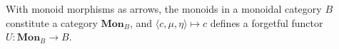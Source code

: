 With monoid morphisms as arrows, the monoids in a monoidal category $B$ constitute a category $\mathbf{Mon}_B$, and $\langle c, \mu, \eta \rangle \mapsto c$ defines a forgetful functor $U: \mathbf{Mon}_B \rightarrow B$.
